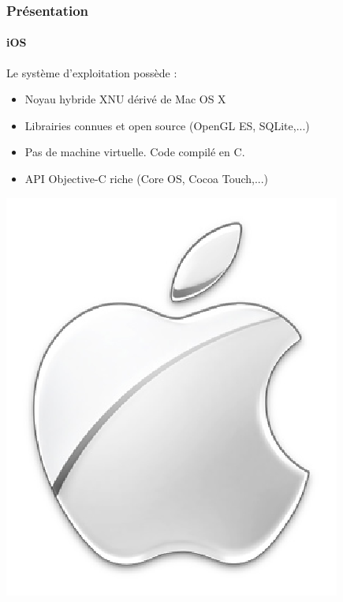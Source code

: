 \begin{frame}
\frametitle{Présentation}
\framesubtitle{iOS}
	\begin{minipage}{8cm}
Le système d'exploitation possède : \\

	\begin{itemize} 
		\item Noyau hybride XNU dérivé de Mac OS X
		\item Librairies connues et open source (OpenGL ES, SQLite,...)
		\item Pas de machine virtuelle. Code compilé en C.
		\item API Objective-C riche (Core OS, Cocoa Touch,...)
	\end{itemize}
	\end{minipage}  \includegraphics[scale=0.2]{img/apple.png} 
\end{frame}


 


